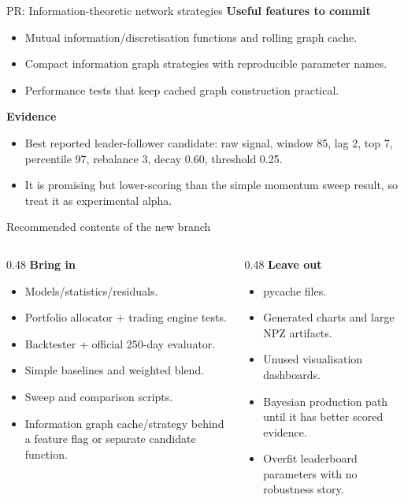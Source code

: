 \documentclass[aspectratio=169]{beamer}
\begin{document}
\begin{frame}{PR: Information-theoretic network strategies}
\textbf{Useful features to commit}
\begin{itemize}
  \item Mutual information/discretisation functions and rolling graph cache.
  \item Compact information graph strategies with reproducible parameter names.
  \item Performance tests that keep cached graph construction practical.
\end{itemize}
\textbf{Evidence}
\begin{itemize}
  \item Best reported leader-follower candidate: raw signal, window 85, lag 2, top 7, percentile 97, rebalance 3, decay 0.60, threshold 0.25.
  \item It is promising but lower-scoring than the simple momentum sweep result, so treat it as experimental alpha.
\end{itemize}
\end{frame}

\begin{frame}{Recommended contents of the new branch}
\begin{columns}
\begin{column}{0.48\textwidth}
\textbf{Bring in}
\begin{itemize}
  \item Models/statistics/residuals.
  \item Portfolio allocator + trading engine tests.
  \item Backtester + official 250-day evaluator.
  \item Simple baselines and weighted blend.
  \item Sweep and comparison scripts.
  \item Information graph cache/strategy behind a feature flag or separate candidate function.
\end{itemize}
\end{column}
\begin{column}{0.48\textwidth}
\textbf{Leave out}
\begin{itemize}
  \item pycache files.
  \item Generated charts and large NPZ artifacts.
  \item Unused visualisation dashboards.
  \item Bayesian production path until it has better scored evidence.
  \item Overfit leaderboard parameters with no robustness story.
\end{itemize}
\end{column}
\end{columns}
\end{frame}
\end{document}
